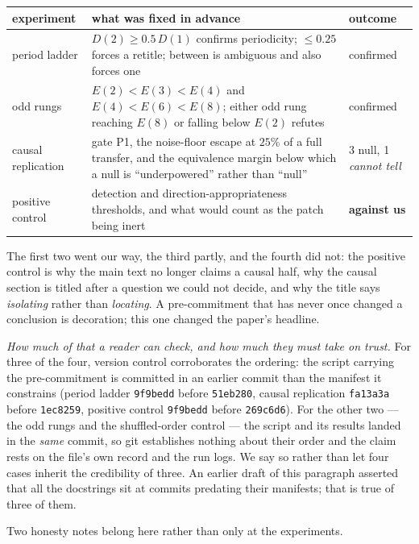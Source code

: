 \documentclass[11pt]{article}
\begin{document}
\begin{center}
\begin{tabular}{@{}lp{3.4cm}p{2.6cm}@{}}
\toprule
experiment & what was fixed in advance & outcome \\
\midrule
period ladder &
  $D(2)\ge 0.5\,D(1)$ confirms periodicity; $\le 0.25$ forces a retitle;
  between is ambiguous and also forces one &
  confirmed \\
odd rungs &
  $E(2)<E(3)<E(4)$ and $E(4)<E(6)<E(8)$; either odd rung reaching $E(8)$ or
  falling below $E(2)$ refutes &
  confirmed \\
causal replication &
  gate P1, the noise-floor escape at $25\%$ of a full transfer, and the
  equivalence margin below which a null is ``underpowered'' rather than
  ``null'' &
  3 null, 1 \emph{cannot tell} \\
positive control &
  detection and direction-appropriateness thresholds, and what would count
  as the patch being inert &
  \textbf{against us} \\
\bottomrule
\end{tabular}
\end{center}

\noindent The first two went our way, the third partly, and the fourth did not:
the positive control is why the main text no longer claims a causal half, why
the causal section is titled after a question we could not decide, and why the
title says \emph{isolating} rather than \emph{locating}. A pre-commitment that
has never once changed a conclusion is decoration; this one changed the paper's
headline.

\emph{How much of that a reader can check, and how much they must take on
trust.} For three of the four, version control corroborates the ordering: the
script carrying the pre-commitment is committed in an earlier commit than the
manifest it constrains (period ladder \texttt{9f9bedd} before
\texttt{51eb280}, causal replication \texttt{fa13a3a} before \texttt{1ec8259},
positive control \texttt{9f9bedd} before \texttt{269c6d6}). For the other two
--- the odd rungs and the shuffled-order control --- the script and its results
landed in the \emph{same} commit, so git establishes nothing about their order
and the claim rests on the file's own record and the run logs. We say so rather
than let four cases inherit the credibility of three. An earlier draft of this
paragraph asserted that all the docstrings sit at commits predating their
manifests; that is true of three of them.

Two honesty notes belong here rather than only at the experiments.
\end{document}
